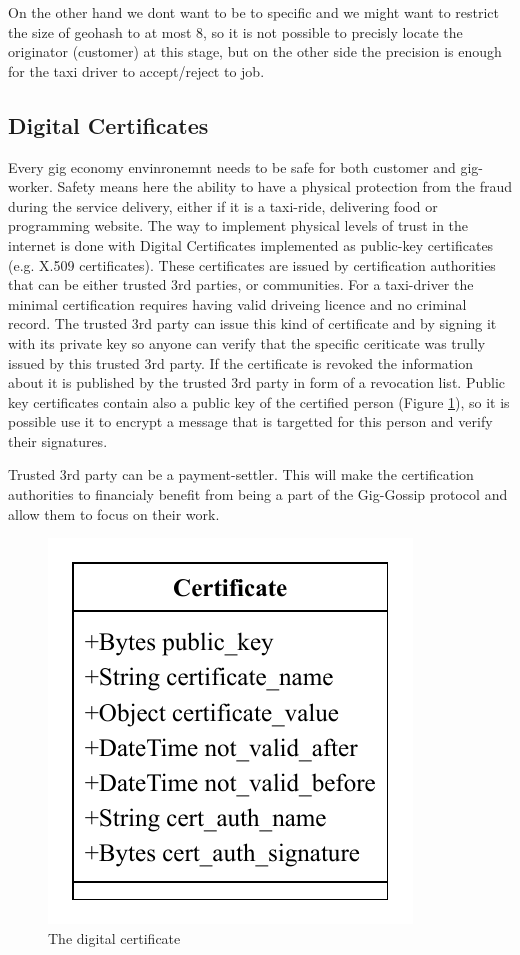 \documentclass{article}
\begin{document}
On the other hand we dont want to be to specific and we might want to restrict the size of geohash to at most 8, so it is not possible to precisly locate the originator (customer) at this stage, but on the other side the precision is enough for the taxi driver to accept/reject to job.

\subsection{Digital Certificates}

Every gig economy envinronemnt needs to be safe for both customer and gig-worker. Safety means here the ability to have a physical protection from the fraud during the service delivery, either if it is a taxi-ride, delivering food or programming website. The way to implement physical levels of trust in the internet is done with Digital Certificates implemented as public-key certificates (e.g. X.509 certificates). These certificates are issued by certification authorities that can be either trusted 3rd parties, or communities. For a taxi-driver the minimal certification requires having valid driveing licence and no criminal record. The trusted 3rd party can issue this kind of certificate and by signing it with its private key so anyone can verify that the specific ceriticate was trully issued by this trusted 3rd party. If the certificate is revoked the information about it is published by the trusted 3rd party in form of a revocation list. Public key certificates contain also a public key of the certified person (Figure \ref{fig:fr:certificate}), so it is possible use it to encrypt a message that is targetted for this person and verify their signatures.

Trusted 3rd party can be a payment-settler. This will make the certification authorities to financialy benefit from being a part of the Gig-Gossip protocol and allow them to focus on their work.

\begin{figure}
	\centering
	\includegraphics[scale=0.7]{Certificate.pdf}
	\caption{The digital certificate}
	\label{fig:fr:certificate}
\end{figure}
\end{document}
